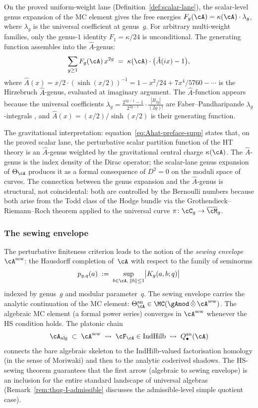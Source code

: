 On the proved uniform-weight lane
(Definition~\ref{def:scalar-lane}), the scalar-level genus expansion of
the MC element gives the free energies
$F_g(\cA)=\kappa(\cA)\cdot\lambda_g$, where $\lambda_g$ is the
universal coefficient at genus~$g$. For arbitrary multi-weight
families, only the genus-$1$ identity $F_1=\kappa/24$ is
unconditional.
The generating function assembles into the $\hat A$-genus:
\begin{equation}\label{eq:Ahat-preface-supp}
\sum_{g\ge 1}F_g(\cA)\,x^{2g}
\;=\;
\kappa(\cA)\cdot
\bigl(\hat A(ix)-1\bigr),
\end{equation}
where
$\hat A(x)=x/2\cdot(\sinh(x/2))^{-1}
=1-x^2/24+7x^4/5760-\cdots$
is the Hirzebruch $\hat A$-genus, evaluated at imaginary argument.
The $\hat A$-function appears because the universal coefficients
$\lambda_g=\tfrac{2^{2g-1}-1}{2^{2g-1}}\cdot\tfrac{|B_{2g}|}{(2g)!}$
are Faber--Pandharipande $\lambda_g$-integrals
\cite{FP03}, and $\hat A(x)=(x/2)/\sinh(x/2)$ is their
generating function.

The gravitational interpretation:
equation~\eqref{eq:Ahat-preface-supp} states that, on the proved
scalar lane, the perturbative scalar partition function of the
HT theory is an $\hat A$-genus weighted by the gravitational
central charge $\kappa(\cA)$. The $\hat A$-genus is the index
density of the Dirac operator; the scalar-lane genus expansion
of $\Theta_\cA$ produces it as a formal consequence of $D^2=0$
on the moduli space of
curves. The connection between the genus expansion and the
$\hat A$-genus is structural, not coincidental: both are
controlled by the Bernoulli numbers because both arise from the
Todd class of the Hodge bundle via the Grothendieck--Riemann--Roch
theorem applied to the universal curve
$\pi\colon\cC_g\to\overline{\cM}_g$.

\subsubsection*{The sewing envelope}

The perturbative finiteness criterion leads to the notion of
the \emph{sewing envelope} $\cA^{\mathrm{sew}}$: the Hausdorff
completion of~$\cA$ with respect to the family of seminorms
\[
p_{g,q}(a)
\;:=\;
\sup_{b\in\cA,\,\|b\|\le 1}
\bigl|K_g(a,b;q)\bigr|
\]
indexed by genus~$g$ and modular parameter~$q$. The sewing
envelope carries the analytic continuation of the MC element:
$\Theta_\cA^{\mathrm{an}}\in\MC(\gAmod\,\hat\otimes\,
\cA^{\mathrm{sew}})$. The algebraic MC element (a formal power
series) converges in $\cA^{\mathrm{sew}}$ whenever the HS
condition holds. The platonic chain
\[
\cA_{\mathrm{alg}}
\;\subset\;
\cA^{\mathrm{sew}}
\;\rightsquigarrow\;
\cF_\cA\in\mathrm{IndHilb}
\;\rightsquigarrow\;
Q_\bullet^{\mathrm{an}}(\cA)
\]
connects the bare algebraic skeleton to the IndHilb-valued
factorisation homology (in the sense of Moriwaki) and then to
the analytic coderived shadows. The HS-sewing theorem guarantees
that the first arrow (algebraic to sewing envelope) is an
inclusion for the entire standard landscape of universal algebras
(Remark~\ref{rem:thqg-I-admissible} discusses the admissible-level
simple quotient case).

